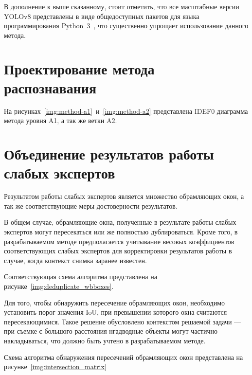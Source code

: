 В дополнение к выше сказанному, стоит отметить, что все масштабные версии YOLOv8 представлены в виде общедоступных пакетов для языка программирования Python~3~\cite{python3}, что существенно упрощает использование данного метода.

\section{Проектирование метода распознавания}

На рисунках~\ref{img:method-a1}~и~\ref{img:method-a2} представлена IDEF0 диаграмма метода уровня A1, а так же ветки A2.



\section{Объединение результатов работы слабых экспертов}

Результатом работы слабых экспертов является множество обрамляющих окон, а так же соответствующие меры достоверности результатов.

В общем случае, обрамляющие окна, полученные в результате работы слабых экспертов могут пересекаться или же полностью дублироваться. Кроме того, в разрабатываемом методе предполагается учитывание весовых коэффициентов соответствующих слабых экспертов для корректировки результатов работы в случае, когда контекст снимка заранее известен.

\clearpage

Соответствующая схема алгоритма представлена на рисунке~\ref{img:deduplicate_wbboxes}.


Для того, чтобы обнаружить пересечение обрамляющих окон, необходимо установить порог значения IoU, при превышении которого окна считаются пересекающимися. Такое решение обусловлено контекстом решаемой задачи --- при съемке с большого расстояния нгадводные объекты могут частично накладываться, что должно быть учтено в разрабатываемом методе.

Схема алгоритма обнаружения пересечений обрамляющих окон представлена на рисунке~\ref{img:intersection_matrix}


